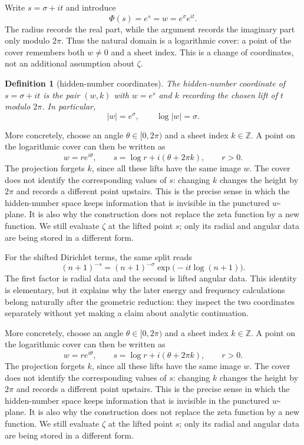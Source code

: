 \documentclass[submission,noinfoline]{jsfds}
\newtheorem{definition}[theorem]{Definition}
\begin{document}
Write $s=\sigma+it$ and introduce
\[
  \Phi(s)=e^s=w=e^\sigma e^{it}.
\]
The radius records the real part, while the argument records the imaginary
part only modulo $2\pi$. Thus the natural domain is a logarithmic cover: a
point of the cover remembers both $w\neq0$ and a sheet index. This is a
change of coordinates, not an additional assumption about $\zeta$.

\begin{definition}[hidden-number coordinates]\label{def:coords}
The hidden-number coordinate of $s=\sigma+it$ is the pair
$(w,k)$ with $w=e^s$ and $k$ recording the chosen lift of $t$ modulo
$2\pi$. In particular,
\[
  |w|=e^\sigma,\qquad \log|w|=\sigma .
\]
\end{definition}

More concretely, choose an angle $\theta\in[0,2\pi)$ and a sheet index
$k\in\mathbb Z$. A point on the logarithmic cover can then be written as
\[
  w=re^{i\theta},\qquad
  s=\log r+i(\theta+2\pi k),\qquad r>0.
\]
The projection forgets $k$, since all these lifts have the same image
$w$. The cover does not identify the corresponding values of $s$: changing
$k$ changes the height by $2\pi$ and records a different point upstairs.
This is the precise sense in which the hidden-number space keeps information
that is invisible in the punctured $w$-plane. It is also why the construction
does not replace the zeta function by a new function. We still evaluate
$\zeta$ at the lifted point $s$; only its radial and angular data are being
stored in a different form.

For the shifted Dirichlet terms, the same split reads
\[
  (n+1)^{-s}=(n+1)^{-\sigma}
  \exp\bigl(-it\log(n+1)\bigr).
\]
The first factor is radial data and the second is lifted angular data. This
identity is elementary, but it explains why the later energy and frequency
calculations belong naturally after the geometric reduction: they inspect
the two coordinates separately without yet making a claim about analytic
continuation.

More concretely, choose an angle $\theta\in[0,2\pi)$ and a sheet index
$k\in\mathbb Z$. A point on the logarithmic cover can then be written as
\[
  w=re^{i\theta},\qquad
  s=\log r+i(\theta+2\pi k),\qquad r>0.
\]
The projection forgets $k$, since all these lifts have the same image
$w$. The cover does not identify the corresponding values of $s$: changing
$k$ changes the height by $2\pi$ and records a different point upstairs.
This is the precise sense in which the hidden-number space keeps information
that is invisible in the punctured $w$-plane. It is also why the construction
does not replace the zeta function by a new function. We still evaluate
$\zeta$ at the lifted point $s$; only its radial and angular data are being
stored in a different form.
\end{document}
